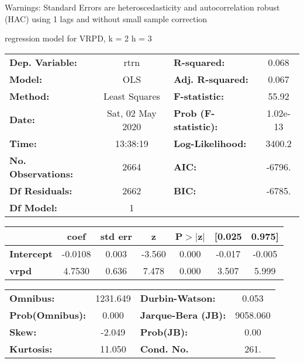 Warnings: \newline
 [1] Standard Errors are heteroscedasticity and autocorrelation robust (HAC) using 1 lags and without small sample correction\ 

regression model for VRPD, k = 2 h = 3\begin{center}
\begin{tabular}{lclc}
\toprule
\textbf{Dep. Variable:}    &       rtrn       & \textbf{  R-squared:         } &     0.068   \\
\textbf{Model:}            &       OLS        & \textbf{  Adj. R-squared:    } &     0.067   \\
\textbf{Method:}           &  Least Squares   & \textbf{  F-statistic:       } &     55.92   \\
\textbf{Date:}             & Sat, 02 May 2020 & \textbf{  Prob (F-statistic):} &  1.02e-13   \\
\textbf{Time:}             &     13:38:19     & \textbf{  Log-Likelihood:    } &    3400.2   \\
\textbf{No. Observations:} &        2664      & \textbf{  AIC:               } &    -6796.   \\
\textbf{Df Residuals:}     &        2662      & \textbf{  BIC:               } &    -6785.   \\
\textbf{Df Model:}         &           1      & \textbf{                     } &             \\
\bottomrule
\end{tabular}
\begin{tabular}{lcccccc}
                   & \textbf{coef} & \textbf{std err} & \textbf{z} & \textbf{P$> |$z$|$} & \textbf{[0.025} & \textbf{0.975]}  \\
\midrule
\textbf{Intercept} &      -0.0108  &        0.003     &    -3.560  &         0.000        &       -0.017    &       -0.005     \\
\textbf{vrpd}      &       4.7530  &        0.636     &     7.478  &         0.000        &        3.507    &        5.999     \\
\bottomrule
\end{tabular}
\begin{tabular}{lclc}
\textbf{Omnibus:}       & 1231.649 & \textbf{  Durbin-Watson:     } &    0.053  \\
\textbf{Prob(Omnibus):} &   0.000  & \textbf{  Jarque-Bera (JB):  } & 9058.060  \\
\textbf{Skew:}          &  -2.049  & \textbf{  Prob(JB):          } &     0.00  \\
\textbf{Kurtosis:}      &  11.050  & \textbf{  Cond. No.          } &     261.  \\
\bottomrule
\end{tabular}
\end{center}

